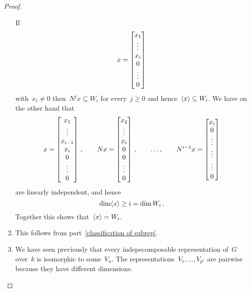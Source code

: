 \begin{proof}
\begin{enumerate}
      If
      \[
          x
        = \begin{bmatrix} x_1 \\ \vdots \\ x_i \\ 0 \\ \vdots \\ 0  \end{bmatrix}
      \]
      with~$x_i \neq 0$ then~$N^j x \subseteq W_i$ for every~$j \geq 0$ and hence~$\langle x\rangle \subseteq W_i$.
      We have on the other hand that
      \[
        x
        = \begin{bmatrix} x_1 \\ \vdots \\ x_{i-1} \\ x_i \\ 0 \\ \vdots \\ 0  \end{bmatrix} \,,
        \qquad
        N x
        = \begin{bmatrix} x_2 \\ \vdots \\ x_i \\ 0 \\ 0 \\ \vdots \\ 0  \end{bmatrix} \,,
        \qquad
        \dotsc,
        \qquad
        N^{i-1} x
        = \begin{bmatrix} x_i \\ 0 \\ \vdots \\ \vdots \\ \vdots \\ 0 \end{bmatrix}
      \]
      are linearly independent, and hence
      \[
              \dim \langle x\rangle
        \geq  i
        =     \dim W_i \,.
      \]
      Together this shows that~$\langle x\rangle = W_i$.
      
    \item
      This follows from part~\ref{classification of subrep}.
      
    \item
      We have seen previously that every {\fd} indepecomposable representation of~$G$ over~$k$ is isomorphic to some~$V_n$.
      The representations~$V_1, \dotsc, V_{p^r}$ are pairwise  because they have different dimensions.
    \qedhere
  \end{enumerate}
\end{proof}



